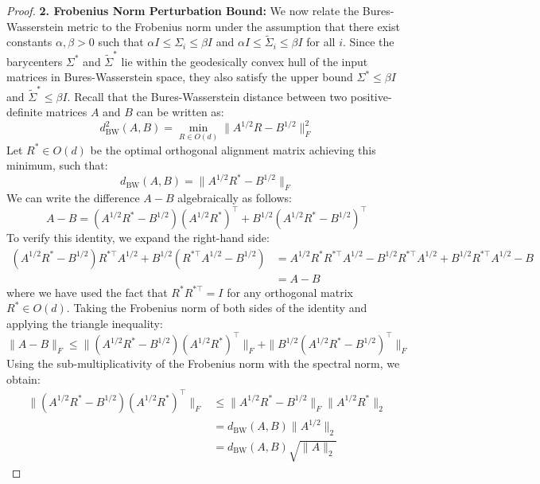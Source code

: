 \documentclass{article}
\theoremstyle{plain}
\theoremstyle{definition}
\theoremstyle{remark}
\begin{document}
\begin{proof}
\textbf{2. Frobenius Norm Perturbation Bound:}
We now relate the Bures-Wasserstein metric to the Frobenius norm under the assumption that there exist constants $\alpha, \beta > 0$ such that $\alpha I \le \Sigma_i \le \beta I$ and $\alpha I \le \tilde{\Sigma}_i \le \beta I$ for all $i$.
Since the barycenters $\Sigma^*$ and $\tilde{\Sigma}^*$ lie within the geodesically convex hull of the input matrices in Bures-Wasserstein space, they also satisfy the upper bound $\Sigma^* \le \beta I$ and $\tilde{\Sigma}^* \le \beta I$.
Recall that the Bures-Wasserstein distance between two positive-definite matrices $A$ and $B$ can be written as:
\begin{equation}
  d_{\text{BW}}^2(A, B) = \min_{R \in O(d)} \| A^{1/2} R - B^{1/2} \|_F^2
\end{equation}
Let $R^* \in O(d)$ be the optimal orthogonal alignment matrix achieving this minimum, such that:
\begin{equation}
  d_{\text{BW}}(A, B) = \| A^{1/2} R^* - B^{1/2} \|_F
\end{equation}
We can write the difference $A - B$ algebraically as follows:
\begin{equation}
  A - B = (A^{1/2} R^* - B^{1/2}) (A^{1/2} R^* )^\top + B^{1/2} (A^{1/2} R^* - B^{1/2})^\top
\end{equation}
To verify this identity, we expand the right-hand side:
\begin{align}
  (A^{1/2} R^* - B^{1/2}) R^{*\top} A^{1/2} + B^{1/2} (R^{*\top} A^{1/2} - B^{1/2}) &= A^{1/2} R^* R^{*\top} A^{1/2} - B^{1/2} R^{*\top} A^{1/2} + B^{1/2} R^{*\top} A^{1/2} - B \\
  &= A - B
\end{align}
where we have used the fact that $R^* R^{*\top} = I$ for any orthogonal matrix $R^* \in O(d)$.
Taking the Frobenius norm of both sides of the identity and applying the triangle inequality:
\begin{equation}
  \| A - B \|_F \le \| (A^{1/2} R^* - B^{1/2}) (A^{1/2} R^*)^\top \|_F + \| B^{1/2} (A^{1/2} R^* - B^{1/2})^\top \|_F
\end{equation}
Using the sub-multiplicativity of the Frobenius norm with the spectral norm, we obtain:
\begin{align}
  \| (A^{1/2} R^* - B^{1/2}) (A^{1/2} R^*)^\top \|_F &\le \| A^{1/2} R^* - B^{1/2} \|_F \| A^{1/2} R^* \|_2 \\
  &= d_{\text{BW}}(A, B) \| A^{1/2} \|_2 \\
  &= d_{\text{BW}}(A, B) \sqrt{\|A\|_2}
\end{align}

\end{proof}
\end{document}
